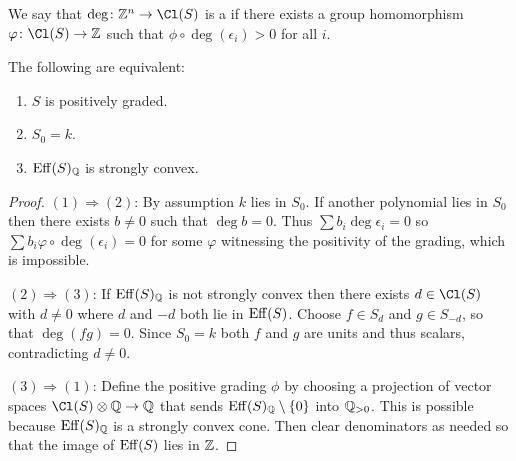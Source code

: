 \documentclass{amsart}
\begin{document}
\begin{defn}\label{defn:posGrading}
  We say that $\deg\colon\ZZ^n\to\Cl(S)$ is a  if there exists a group homomorphism $\phi\colon \Cl(S) \to \ZZ$ such that $\phi \circ \deg(\epsilon_i) > 0 $ for all $i$.
\end{defn}
\begin{lemma}\label{lem:positive-gradings}
  The following are equivalent:
  \begin{enumerate}
    \item $S$ is positively graded.
    \item $S_0=k$.
    \item $\operatorname{Eff}(S)_{\mathbb Q}$ is strongly convex.
  \end{enumerate}
\end{lemma}
\begin{proof}
    $(1)\Rightarrow (2)$:  By assumption $k$ lies in $S_0$.  If another polynomial lies in $S_0$ then there exists $b\neq 0$ such that $\deg b=0$.  Thus $\sum b_i\deg\epsilon_i=0$ so $\sum b_i\varphi\circ\deg(\epsilon_i)=0$ for some $\varphi$ witnessing the positivity of the grading, which is impossible.

    $(2)\Rightarrow (3)$:  If $\operatorname{Eff}(S)_{\mathbb Q}$ is not strongly convex then there exists $d\in \Cl(S)$ with $d\neq 0$ where $d$ and $-d$ both lie in $\operatorname{Eff}(S)$.  Choose $f\in S_d$ and $g\in S_{-d}$, so that $\deg(fg)=0$.  Since $S_0=k$ both $f$ and $g$ are units and thus scalars, contradicting $d\neq 0$.

    $(3)\Rightarrow (1)$:  Define the positive grading $\phi$ by choosing a projection of vector spaces $\Cl(S)\otimes \QQ\to \QQ$ that sends $\operatorname{Eff}(S)_{\mathbb Q}\setminus \{0\}$ into $\mathbb Q_{>0}$.  This is possible because $\operatorname{Eff}(S)_{\mathbb Q}$ is a strongly convex cone. Then clear denominators as needed so that the image of $\operatorname{Eff}(S)$ lies in $\mathbb Z$.
  \end{proof}
\end{document}
